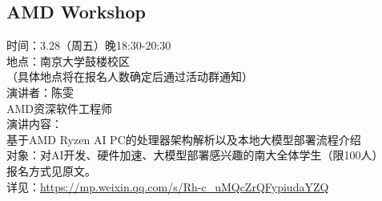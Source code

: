 \documentclass[letterpaper, 12pt]{article}
\begin{document}
\begin{multicols}{2}
\subsection{AMD Workshop} %
时间：3.28（周五）晚18:30-20:30
\\地点：南京大学鼓楼校区
\\（具体地点将在报名人数确定后通过活动群通知）
\\演讲者：陈雯
\\AMD资深软件工程师
\\演讲内容：
\\基于AMD Ryzen AI PC的处理器架构解析以及本地大模型部署流程介绍
\\对象：对AI开发、硬件加速、大模型部署感兴趣的南大全体学生（限100人）
\\报名方式见原文。
\\详见：\url{https://mp.weixin.qq.com/s/Rh-c_uMQcZrQFypiudaYZQ}
\end{multicols}
\end{document}
